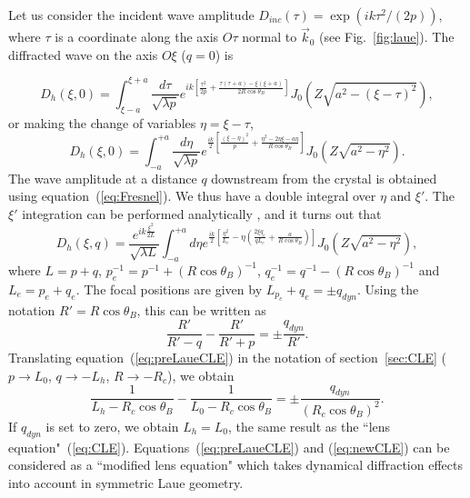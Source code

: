\documentclass[preprint]{iucr}              %
\newcommand{\inred}[1]{{\color{red}#1}}
\begin{document}
Let us consider the incident wave amplitude $D_{inc}(\tau)=\exp(i k \tau^2/(2p))$, where $\tau$ is a coordinate along the axis $O\tau$ normal to $\vec k_0$ (see Fig.~\ref{fig:laue}). The diffracted wave on the axis $O\xi$
($q=0$) is

\begin{equation}
    D_h(\xi,0)=\int_{\xi-a}^{\xi+a}\frac{d\tau}{\sqrt{\lambda p}}
    e^{ik\left[\frac{\tau^2}{2p}+\frac{\tau(\tau+a)-\xi(\xi+a)}{2R \cos\theta_B}\right]}
    J_0(Z\sqrt{a^2-(\xi-\tau)^2}),
\end{equation}
or making the change of variables $\eta=\xi-\tau$,
\begin{equation}
    D_h(\xi,0)=\int_{-a}^{+a}\frac{d\eta}{\sqrt{\lambda p}}
    e^{\frac{ik}{2}\left[\frac{(\xi-\eta)^2}{p}+\frac{\eta^2-2\eta\xi-a\eta}{R \cos\theta_B}\right]}
    J_0(Z\sqrt{a^2-\eta^2}).
\end{equation}
The wave amplitude at a distance $q$ downstream from the crystal is obtained using equation~(\ref{eq:Fresnel}). We thus have a double integral over $\eta$ and $\xi'$. The $\xi'$ integration can be performed analytically \cite{GuigayFerrero2013}, and it turns out that
\begin{equation}
\label{eq:Dhpropagated}
    D_h(\xi,q)=
    \frac{e^{i k \frac{\xi^2}{2L}}}{\sqrt{\lambda L}}
    \int_{-a}^{+a} d\eta
    e^{\frac{ik}{2}
    [\frac{\eta^2}{L_e}-\eta(
    \frac{2\xi q_e}{q L_e}+
    \frac{a}{R \cos\theta_B}
    )]}
    J_0(Z\sqrt{a^2-\eta^2}),
\end{equation}
where $L=p+q$, $p_e^{-1}=p^{-1}+(R\cos\theta_B)^{-1}$, $q_e^{-1}=q^{-1}-(R\cos\theta_B)^{-1}$ and $L_e=p_e+q_e$.
The focal positions are given by \inred{$L_p_e+q_e=\pm q_{dyn}$}. Using the notation $R'=R\cos\theta_B$, this can be written as
\begin{equation}
\label{eq:preLaueCLE}
    \frac{R'}{R'-q} - \frac{R'}{R' + p} = \pm \frac{q_{dyn}}{R'}.
\end{equation}
Translating equation~(\ref{eq:preLaueCLE}) in the notation of section~\ref{sec:CLE} ($p \to L_0$, $q \to -L_h$, $R \to -R_c$), we obtain
\begin{equation}
\label{eq:newCLE}
    \frac{1}{L_h-R_c \cos\theta_B} -
    \frac{1}{L_0 - R_c \cos\theta_B} =
    \pm \frac{q_{dyn}}{(R_c \cos\theta_B)^2}.
\end{equation}
If $q_{dyn}$ is set to zero, we obtain $L_h=L_0$, the same result as the ``lens equation"~(\ref{eq:CLE}).
Equations~(\ref{eq:preLaueCLE}) and (\ref{eq:newCLE}) can be considered as a ``modified lens equation" which takes dynamical diffraction effects into account in symmetric Laue geometry.
\end{document}
